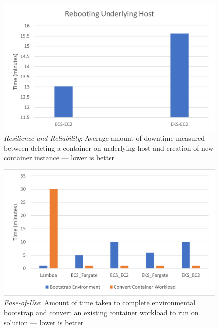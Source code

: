 \begin{figure}[hp]
  \includegraphics{images/rr-reboot.png}
  \caption{\emph{Resilience and Reliability}: Average amount of downtime measured between deleting a container on underlying host and creation of new container instance --- lower is better}
  \label{fig:rr_reboot}
\end{figure}

\begin{figure}[hp]
  \includegraphics{images/eou.png}
  \caption{\emph{Ease-of-Use}: Amount of time taken to complete environmental bootstrap and convert an existing container workload to run on solution --- lower is better}
  \label{fig:eou}
\end{figure}
